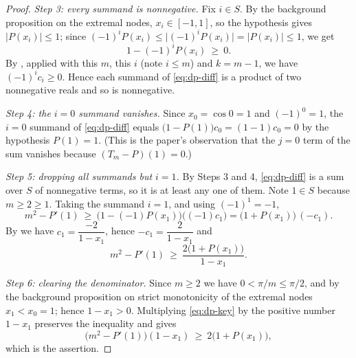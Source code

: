 \begin{proof}
\emph{Step 3: every summand is nonnegative.} Fix $i\in S$. By the background
proposition on the extremal nodes, $x_i\in[-1,1]$, so the hypothesis gives
$\lvert P(x_i)\rvert\le1$; since
$(-1)^iP(x_i)\le\lvert(-1)^iP(x_i)\rvert=\lvert P(x_i)\rvert\le1$, we get
\[
  1-(-1)^iP(x_i)\ \ge\ 0 .
\]
By , applied with this $m$, this $i$ (note $i\le m$)
and $k=m-1$, we have $(-1)^ic_i\ge0$. Hence each summand of \eqref{eq:dp-diff}
is a product of two nonnegative reals and so is nonnegative.

\emph{Step 4: the $i=0$ summand vanishes.} Since $x_0=\cos0=1$ and $(-1)^0=1$,
the $i=0$ summand of \eqref{eq:dp-diff} equals
$\bigl(1-P(1)\bigr)c_0=(1-1)c_0=0$ by the hypothesis $P(1)=1$. (This is the
paper's observation that the $j=0$ term of the sum vanishes because
$(T_m-P)(1)=0$.)

\emph{Step 5: dropping all summands but $i=1$.} By Steps 3 and 4,
\eqref{eq:dp-diff} is a sum over $S$ of nonnegative terms, so it is at least any
one of them. Note $1\in S$ because $m\ge2\ge1$. Taking the summand $i=1$, and
using $(-1)^1=-1$,
\[
  m^2-P'(1)\ \ge\ \bigl(1-(-1)P(x_1)\bigr)\bigl((-1)c_1\bigr)
   =\bigl(1+P(x_1)\bigr)\,(-c_1).
\]
By  we have $c_1=\dfrac{-2}{1-x_1}$, hence
$-c_1=\dfrac{2}{1-x_1}$ and
\begin{equation}\label{eq:dp-key}
  m^2-P'(1)\ \ge\ \frac{2\bigl(1+P(x_1)\bigr)}{1-x_1}.
\end{equation}

\emph{Step 6: clearing the denominator.} Since $m\ge2$ we have
$0<\pi/m\le\pi/2$, and by the background proposition on strict monotonicity of
the extremal nodes $x_1<x_0=1$; hence $1-x_1>0$. Multiplying
\eqref{eq:dp-key} by the positive number $1-x_1$ preserves the inequality and
gives
\[
  \bigl(m^2-P'(1)\bigr)(1-x_1)\ \ge\ 2\bigl(1+P(x_1)\bigr),
\]
which is the assertion.
\end{proof}
